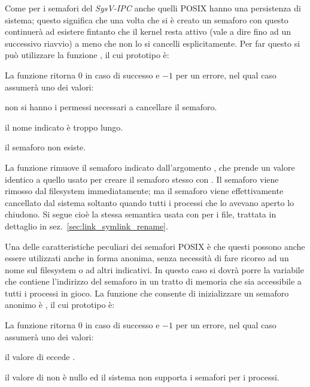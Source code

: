 Come per i semafori del \textit{SysV-IPC} anche quelli POSIX hanno una
persistenza di sistema; questo significa che una volta che si è creato un
semaforo con  questo continuerà ad esistere fintanto che il
kernel resta attivo (vale a dire fino ad un successivo riavvio) a meno che non
lo si cancelli esplicitamente. Per far questo si può utilizzare la funzione
, il cui prototipo è:

\begin{funcproto}{

}

{La funzione ritorna $0$ in caso di successo e $-1$ per un errore, nel qual
  caso  assumerà uno dei valori:
  \begin{errlist}
    \item[\errcode{EACCES}] non si hanno i permessi necessari a cancellare il
      semaforo.
    \item[\errcode{ENAMETOOLONG}] il nome indicato è troppo lungo.
    \item[\errcode{ENOENT}] il semaforo  non esiste.
  \end{errlist}
}  
\end{funcproto}

La funzione rimuove il semaforo indicato dall'argomento , che
prende un valore identico a quello usato per creare il semaforo stesso con
. Il semaforo viene rimosso dal filesystem immediatamente; ma
il semaforo viene effettivamente cancellato dal sistema soltanto quando tutti
i processi che lo avevano aperto lo chiudono. Si segue cioè la stessa
semantica usata con  per i file, trattata in dettaglio in
sez.~\ref{sec:link_symlink_rename}.

Una delle caratteristiche peculiari dei semafori POSIX è che questi possono
anche essere utilizzati anche in forma anonima, senza necessità di fare
ricorso ad un nome sul filesystem o ad altri indicativi.  In questo caso si
dovrà porre la variabile che contiene l'indirizzo del semaforo in un tratto di
memoria che sia accessibile a tutti i processi in gioco.  La funzione che
consente di inizializzare un semaforo anonimo è , il cui
prototipo è:

\begin{funcproto}{
}

{La funzione ritorna $0$ in caso di successo e $-1$ per un errore, nel qual
  caso  assumerà uno dei valori:
  \begin{errlist}
    \item[\errcode{EINVAL}] il valore di  eccede
      .
    \item[\errcode{ENOSYS}] il valore di  non è nullo ed il
      sistema non supporta i semafori per i processi.
  \end{errlist}
}  
\end{funcproto}

